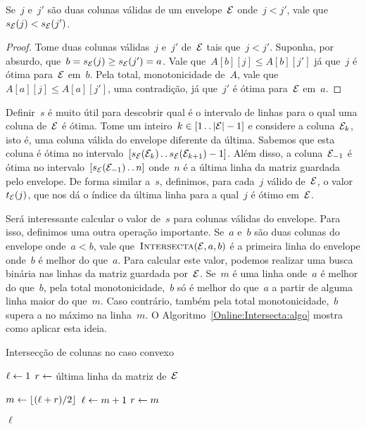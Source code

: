 \begin{lema} \label{Online:Ordered}
Se~$j$ e~$j'$ são duas colunas válidas de um envelope~$\mathcal{E}$ onde~$j < j'$, vale que~${ s_{\mathcal{E}}(j) < s_{\mathcal{E}}(j') }$.
\end{lema}

\begin{proof}
Tome duas colunas válidas~$j$ e~$j'$ de~$\mathcal{E}$ tais que~$j < j'$. Suponha, por absurdo,  que~${b  = s_{\mathcal{E}}(j) \geq s_{\mathcal{E}}(j') = a}$. Vale que~$A[b][j] \leq A[b][j']$ já que~$j$ é ótima para~$\mathcal{E}$ em~$b$. Pela total, monotonicidade de~$A$, vale que~$A[a][j] \leq A[a][j']$, uma contradição, já que~$j'$ é ótima para~$\mathcal{E}$ em~$a$.
\end{proof}

Definir~$s$ é muito útil para descobrir qual é o intervalo de linhas para o qual uma coluna de~$\mathcal{E}$ é ótima. Tome um inteiro~$k \in [1 \,.\,.\, |\mathcal{E}|-1]$ e considere a coluna~$\mathcal{E}_k$, isto é, uma coluna válida do envelope diferente da última. Sabemos que esta coluna é ótima no intervalo~$[s_{\mathcal{E}}(\mathcal{E}_k) \,.\,.\, s_{\mathcal{E}}(\mathcal{E}_{k+1}) - 1]$. Além disso, a coluna~$\mathcal{E}_{-1}$ é ótima no intervalo~$[s_{\mathcal{E}}(\mathcal{E}_{-1}) \,.\,.\, n]$ onde~$n$ é a última linha da matriz guardada pelo envelope. De forma similar a~$s$, definimos, para cada~$j$ válido de~$\mathcal{E}$, o valor~$t_{\mathcal{E}}(j)$, que nos dá o índice da última linha para a qual~$j$ é ótimo em~$\mathcal{E}$.

Será interessante calcular o valor de~$s$ para colunas válidas do envelope. Para isso, definimos uma outra operação importante. Se~$a$ e~$b$ são duas colunas do envelope onde~$a < b$, vale que~$\textsc{Intersecta}(\mathcal{E},a,b)$ é a primeira linha do envelope onde~$b$ é melhor do que~$a$. Para calcular este valor, podemos realizar uma busca binária nas linhas da matriz guardada por~$\mathcal{E}$. Se~$m$ é uma linha onde~$a$ é melhor do que~$b$, pela total monotonicidade,~$b$ só é melhor do que~$a$ a partir de alguma linha maior do que~$m$. Caso contrário, também pela total monotonicidade,~$b$ supera a no máximo na linha~$m$. O Algoritmo~\ref{Online:Intersecta:algo} mostra como aplicar esta ideia.

\begin{algorithm}[h]
\caption{Intersecção de colunas no caso convexo}
\label{Online:Intersecta:algo}
\begin{algorithmic}[1]
 
    \State $\ell \leftarrow 1$
    \State $r \leftarrow $ última linha da matriz de~$\mathcal{E}$

        \State $m \leftarrow \lfloor(\ell+r)/2\rfloor$
         \label{Online:Intersecta:algo:comp} 
            \State $\ell \leftarrow m + 1$
        \Else
            \State $r \leftarrow m$
        \EndIf
    \EndWhile

    \State \Return $\ell$
\EndFunction
\end{algorithmic}
\end{algorithm}

